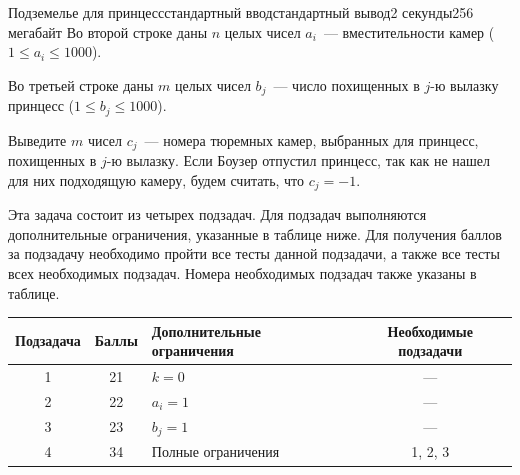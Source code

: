 \begin{problem}{Подземелье для принцесс}{стандартный ввод}{стандартный вывод}{2 секунды}{256 мегабайт}
Во второй строке даны $n$ целых чисел $a_i$~--- вместительности камер ($1 \le a_i \le 1000$).

Во третьей строке даны $m$ целых чисел $b_j$~--- число похищенных в $j$-ю вылазку принцесс ($1 \le b_j \le 1000$).

\OutputFile
Выведите $m$ чисел $c_j$~--- номера тюремных камер, выбранных для принцесс, похищенных в $j$-ю вылазку. Если Боузер отпустил принцесс, так как не нашел для них подходящую камеру, будем считать, что $c_j = -1$.

\Scoring
Эта задача состоит из четырех подзадач. Для подзадач выполняются дополнительные ограничения, указанные в таблице ниже. Для получения баллов за подзадачу необходимо пройти все тесты данной подзадачи, а также все тесты всех необходимых подзадач. Номера необходимых подзадач также указаны в таблице.

\begin{center}
\renewcommand{\arraystretch}{1.5}
\begin{tabular}{|c|c|p{}|c|}
\hline
Подзадача & Баллы & Дополнительные ограничения & Необходимые подзадачи
\\ \hline
1 & 21 & $k = 0$ & {---}
\\ \hline

2 & 22 & $a_i = 1$ & {---}
\\ \hline

3 & 23 & $b_j = 1$ & {---}
\\ \hline
4 & 34 & Полные ограничения & 1, 2, 3
\\ \hline

\end{tabular}

\end{center}

\Examples

\begin{example}
%
%
%
\end{example}

\end{problem}

